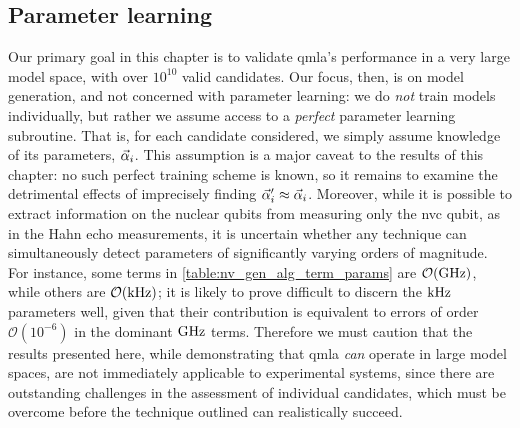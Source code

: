 \subsection{Parameter learning}
Our primary goal in this chapter is to validate \gls{qmla}'s performance in a 
    very large \gls{model space}, with over $10^{10}$ valid candidates. 
Our focus, then, is on model generation, and not concerned with parameter learning:
    we do \emph{not} train models individually, but rather we assume access to a \emph{perfect} parameter learning subroutine.
That is, for each candidate considered, we simply assume knowledge of its parameters, $\vec{\alpha}_i$. 
This assumption is a major caveat to the results of this chapter: 
    no such perfect training scheme is known, 
    so it remains to examine the detrimental effects of imprecisely finding $\vec{\alpha}^{\prime}_i \approx \vec{\alpha}_i$. 
Moreover, while it is possible to extract information on the nuclear qubits from measuring only the 
    \gls{nvc} qubit, as in the Hahn echo measurements, 
    it is uncertain whether any technique can simultaneously detect parameters of significantly varying orders of magnitude.
For instance, some terms in \cref{table:nv_gen_alg_term_params} are $\mathcal{O}(\textrm{GHz})$, 
    while others are $\mathcal{O}(\textrm{kHz})$;
    it is likely to prove difficult to discern the $\textrm{kHz}$ parameters well, given that their contribution is equivalent 
    to errors of order $\mathcal{O}(10^{-6})$ in the dominant $\textrm{GHz}$ terms. 
Therefore we must caution that the results presented here, 
    while demonstrating that \gls{qmla} \emph{can} operate in large model spaces, 
    are not immediately applicable to experimental systems, 
    since there are outstanding challenges in the assessment of individual candidates, 
    which must be overcome before the technique outlined can realistically succeed. 


